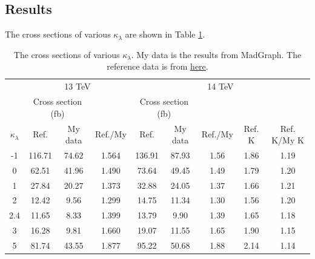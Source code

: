 \documentclass[12pt]{article}
\begin{document}
	\subsection{Results}%
	\label{sub:di_Higgs_sample_generating_results}
		The cross sections of various $\kappa_\lambda$ are shown in Table \ref{tab:di-Higgs-SM-kappa-cross-section}.
		\begin{table}[htpb]
			\centering
			\caption{The cross sections of various $\kappa_\lambda$. My data is the results from MadGraph. The reference data is from \href{https://link.springer.com/content/pdf/10.1007/JHEP06(2019)066.pdf}{here}. }
			\label{tab:di-Higgs-SM-kappa-cross-section}
			\begin{tabular}{c|cc|c|cc|cc|c}
							 & \multicolumn{3}{c|}{13 TeV}                     & \multicolumn{5}{c}{14 TeV}                                     \\
							 & \multicolumn{2}{c|}{Cross section (fb)} &        & \multicolumn{2}{c|}{Cross section (fb)} &       &               \\
							 $\kappa_\lambda$ & Ref.              & My data            & Ref./My& Ref.              & My data            &Ref./My& Ref. K& Ref. K/My K \\ \hline
			-1               & 116.71            & 74.62              & 1.564  & 136.91            & 87.93              & 1.56 & 1.86 & 1.19  \\
			0                & 62.51             & 41.96              & 1.490  & 73.64             & 49.45              & 1.49 & 1.79 & 1.20  \\
			1                & 27.84             & 20.27              & 1.373  & 32.88             & 24.05              & 1.37 & 1.66 & 1.21  \\
			2                & 12.42             & 9.56               & 1.299  & 14.75             & 11.34              & 1.30 & 1.56 & 1.20  \\
			2.4              & 11.65             & 8.33               & 1.399  & 13.79             & 9.90               & 1.39 & 1.65 & 1.18  \\
			3                & 16.28             & 9.81               & 1.660  & 19.07             & 11.55              & 1.65 & 1.90 & 1.15  \\
			5                & 81.74             & 43.55              & 1.877  & 95.22             & 50.68              & 1.88 & 2.14 & 1.14  \\
			\end{tabular}
		\end{table}
\end{document}
